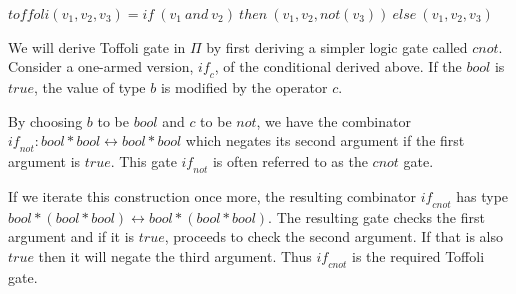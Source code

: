 \documentclass{article}
\begin{document}
\noindent
\ensuremath{ \mathit{toffoli}(v_1,v_2,v_3) = \mathit{if} ~(v_1 ~\mathit{and} ~v_2) ~\mathit{then} ~(v_1, v_2, \mathit{not}(v_3)) ~\mathit{else} ~(v_1, v_2, v_3)}

We will derive Toffoli gate in \ensuremath{\Pi } by first deriving a simpler
logic gate called \ensuremath{\mathit{cnot}}.  Consider a one-armed version, \ensuremath{\mathit{if}_c},
of the conditional derived above. If the \ensuremath{\mathit{bool}} is
\ensuremath{\mathit{true}}, the value of type \ensuremath{b} is modified by the operator \ensuremath{c}.

\begin{center}
\end{center}


By choosing \ensuremath{b} to be \ensuremath{\mathit{bool}} and \ensuremath{c} to be \ensuremath{\mathit{not}}, we have the
combinator \ensuremath{\mathit{if}_{\mathit{not}} : \mathit{bool} *  \mathit{bool}\leftrightarrow \mathit{bool} *  \mathit{bool}} which negates its
second argument if the first argument is \ensuremath{\mathit{true}}. This gate
\ensuremath{\mathit{if}_{\mathit{not}}} is often referred to as the \ensuremath{\mathit{cnot}} gate\cite{Toffoli:1980}.

If we iterate this construction once more, the resulting combinator
\ensuremath{\mathit{if}_{\mathit{cnot}}} has type \ensuremath{\mathit{bool} *  (\mathit{bool} *  \mathit{bool})\leftrightarrow \mathit{bool} *  (\mathit{bool} *  \mathit{bool})}. The
resulting gate checks the first argument and if it is \ensuremath{\mathit{true}},
proceeds to check the second argument. If that is also \ensuremath{\mathit{true}} then
it will negate the third argument. Thus \ensuremath{\mathit{if}_{\mathit{cnot}}} is the required
Toffoli gate.

\begin{center}
\end{center}
\end{document}
